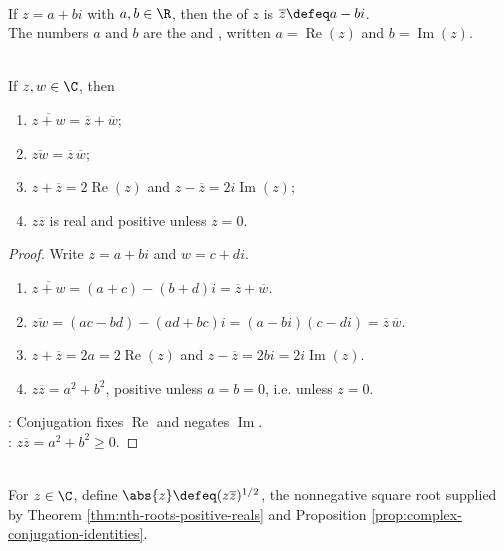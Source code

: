 \begin{definition} \label{def:complex-conjugate-real-imaginary-parts} \\
If $z=a+bi$ with $a,b\in\R$, then the  of $z$ is $\overline{z}\defeq a-bi$.\\
The numbers $a$ and $b$ are the  and , written $a=\operatorname{Re}(z)$ and $b=\operatorname{Im}(z)$.
\end{definition}

\begin{proposition} \label{prop:complex-conjugation-identities} \\
If $z,w\in\C$, then
\begin{enumerate}[label=(\roman*)]
\setlength{\itemsep}{0pt}
\item $\overline{z+w}=\overline{z}+\overline{w}$;
\item $\overline{zw}=\overline{z}\,\overline{w}$;
\item $z+\overline{z}=2\operatorname{Re}(z)$ and $z-\overline{z}=2i\operatorname{Im}(z)$;
\item $z\overline{z}$ is real and positive unless $z=0$.
\end{enumerate}
\begin{proof}
Write $z=a+bi$ and $w=c+di$.
\begin{enumerate}[label=(\roman*)]
\setlength{\itemsep}{0pt}
\item $\overline{z+w}=(a+c)-(b+d)i=\overline{z}+\overline{w}$.
\item $\overline{zw}=(ac-bd)-(ad+bc)i=(a-bi)(c-di)=\overline{z}\,\overline{w}$.
\item $z+\overline{z}=2a=2\operatorname{Re}(z)$ and $z-\overline{z}=2bi=2i\operatorname{Im}(z)$.
\item $z\overline{z}=a^2+b^2$, positive unless $a=b=0$, i.e. unless $z=0$.
\end{enumerate}
: Conjugation fixes $\operatorname{Re}$ and negates $\operatorname{Im}$.\\
: $z\overline{z}=a^2+b^2\geq0$.
\end{proof}
\end{proposition}

\begin{definition} \label{def:complex-absolute-value-analysis} \\
For $z\in\C$, define $\abs{z}\defeq(z\overline{z})^{1/2}$, the nonnegative square root supplied by Theorem \ref{thm:nth-roots-positive-reals} and Proposition \ref{prop:complex-conjugation-identities}.
\end{definition}

